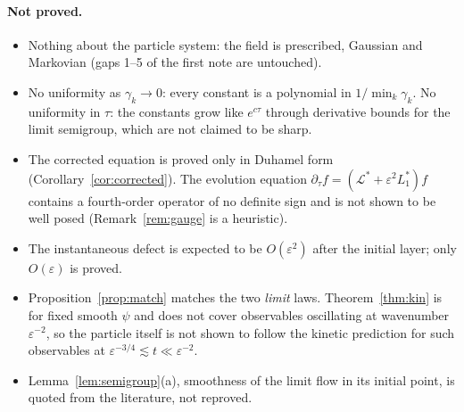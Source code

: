 \documentclass[11pt]{article}
\newcommand{\eps}{\varepsilon}
\newcommand{\cL}{\mathcal{L}}
\theoremstyle{remark}
\begin{document}
\paragraph{Not proved.}
\begin{itemize}
  \item Nothing about the particle system: the field is prescribed, Gaussian
    and Markovian (gaps 1--5 of the first note are untouched).
  \item No uniformity as $\gamma_k\to0$: every constant is a polynomial in
    $1/\min_k\gamma_k$. No uniformity in $\tau$: the constants grow like
    $e^{c\tau}$ through derivative bounds for the limit semigroup, which
    are not claimed to be sharp.
  \item The corrected equation is proved only in Duhamel form
    (Corollary~\ref{cor:corrected}). The evolution equation
    $\partial_\tau f=(\cL^*+\eps^2L_1^*)f$ contains a fourth-order operator
    of no definite sign and is not shown to be well posed
    (Remark~\ref{rem:gauge} is a heuristic).
  \item The instantaneous defect is expected to be $O(\eps^2)$ after the
    initial layer; only $O(\eps)$ is proved.
  \item Proposition~\ref{prop:match} matches the two \emph{limit} laws.
    Theorem~\ref{thm:kin} is for fixed smooth $\psi$ and does not cover
    observables oscillating at wavenumber $\eps^{-2}$, so the particle
    itself is not shown to follow the kinetic prediction for such
    observables at $\eps^{-3/4}\lesssim t\ll\eps^{-2}$.
  \item Lemma~\ref{lem:semigroup}(a), smoothness of the limit flow in its
    initial point, is quoted from the literature, not reproved.
\end{itemize}
\end{document}
